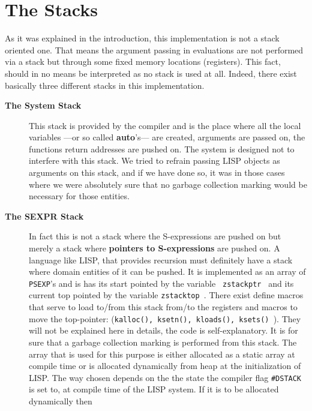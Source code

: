 \section{The Stacks}
As it was explained in the introduction, this implementation is not a stack
oriented  one.  That  means  the  argument  passing  in evaluations are not
performed via a stack but through some fixed memory locations  (registers).
This fact, should  in no means be interpreted as no stack is used at all.
Indeed,   there   exist   basically   three   different   stacks   in  this
implementation.
\begin{description}
\item[{\bf The System Stack}] This stack  is  provided  by  the \C compiler
         and is the place where all the \C local variables ---or so  called
         {\bf auto}'s--- are created, arguments are passed on, the functions
         return addresses are pushed on. The  system  is  designed  not  to
         interfere   with   this  stack.  We  tried to refrain passing LISP
         objects as arguments on this stack, and if we have done so, it was
 in those cases where we were  absolutely  sure  that  no  garbage
         collection marking would be necessary for those entities.
\item[{\bf The SEXPR Stack}]  In  fact  this  is  not  a  stack  where  the
         S-expressions are pushed on but merely a stack where {\bf pointers
         to S-expressions } are pushed  on.  A  language  like  LISP,  that
         provides  recursion  must  definitely  have  a  stack where domain
         entities of it can be pushed. It is implemented  as  an  array  of
         {\tt  PSEXP}'s  and  is has its start pointed by the variable {\tt
         zstackptr  }  and  its  current  top  pointed  by   the   variable
         {\tt  zstacktop  }.  There  exist define macros that serve to load
         to/from this stack from/to the registers and macros  to  move  the
         top-pointer:       ({\tt      \mbox{kalloc()},     \mbox{ksetn()},
         \mbox{kloads()}, \mbox{ksets()} }). They  will  not  be  explained
         here in details, the code is self-explanatory. It is for sure that
         a garbage collection marking is performed  from  this  stack.  The
         array  that  is  used  for  this  purpose is either allocated as a
         static array at compile time or is allocated dynamically from heap
         at the initialization of LISP.  The  way  chosen  depends  on  the
         the  state the compiler flag {\tt \#DSTACK } is set to, at compile
         time of the LISP system. If it is to be allocated dynamically then

\end{description}
